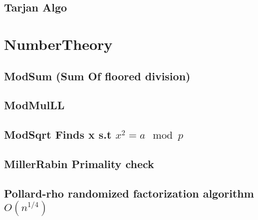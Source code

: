 \subsection{Tarjan Algo}
\vspace{-2.2ex}
\raggedbottom
\vspace{-3.2ex}
\hrulefill

\section{NumberTheory}
\subsection{ModSum (Sum Of floored division)}
\vspace{-2.2ex}
\raggedbottom
\vspace{-3.2ex}
\hrulefill
\subsection{ModMulLL}
\vspace{-2.2ex}
\raggedbottom
\vspace{-3.2ex}
\hrulefill
\subsection{ModSqrt Finds x s.t ${x^2 = a \mod p}$}
\vspace{-2.2ex}
\raggedbottom
\vspace{-3.2ex}
\hrulefill
\subsection{MillerRabin Primality check}
\vspace{-2.2ex}
\raggedbottom
\vspace{-3.2ex}
\hrulefill
\subsection{Pollard-rho randomized factorization algorithm ${O(n^{1/4})}$}
\vspace{-2.2ex}
\raggedbottom
\vspace{-3.2ex}
\hrulefill
